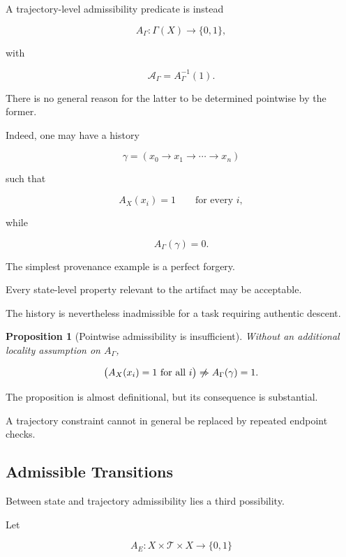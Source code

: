 \documentclass[
  11pt,
  a4paper,
  DIV=12,
  BCOR=0mm,
  parskip=half-
]{scrartcl}
\theoremstyle{definition}
\theoremstyle{plain}
\newtheorem{proposition}[definition]{Proposition}
\theoremstyle{remark}
\begin{document}
A trajectory-level admissibility predicate is instead

\[
  A_\Gamma:\Gamma(X)\to\{0,1\},
\]

with

\[
  \mathcal A_\Gamma
  =
  A_\Gamma^{-1}(1).
\]

There is no general reason for the latter to be determined pointwise by the
former.

Indeed, one may have a history

\[
  \gamma
  =
  (
  x_0\to x_1\to\cdots\to x_n
  )
\]

such that

\[
  A_X(x_i)=1
  \qquad
  \text{for every }i,
\]

while

\[
  A_\Gamma(\gamma)=0.
\]

The simplest provenance example is a perfect forgery.

Every state-level property relevant to the artifact may be acceptable.

The history is nevertheless inadmissible for a task requiring authentic
descent.

\begin{proposition}[Pointwise admissibility is insufficient]
\label{prop:pointwise-insufficient}
Without an additional locality assumption on \(A_\Gamma\),

\[
  \bigl(
    A_X(x_i)=1
    \text{ for all }i
  \bigr)
  \centernot\Rightarrow
  A_\Gamma(\gamma)=1.
\]
\end{proposition}

The proposition is almost definitional, but its consequence is substantial.

A trajectory constraint cannot in general be replaced by repeated endpoint
checks.


\subsection{Admissible Transitions}
\label{app:admissible-transitions}

Between state and trajectory admissibility lies a third possibility.

Let

\[
  A_E:X\times\mathcal T\times X\to\{0,1\}
\]
\end{document}
